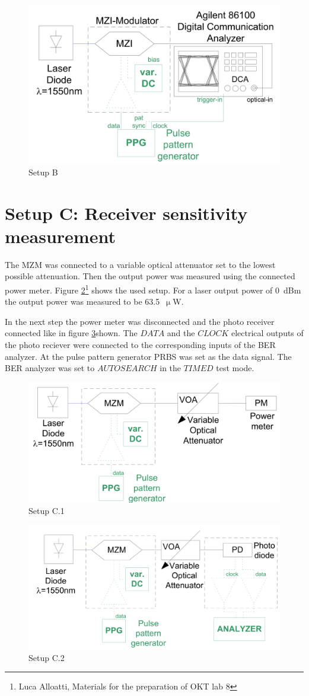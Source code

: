 \begin{figure}%
\centering
\includegraphics[width=.6\columnwidth]{Grafiken/B_setup.png}%
\caption{Setup B}%
\label{fig:B_setup}%
\end{figure} 


\section{Setup C: Receiver sensitivity measurement}

The MZM was connected to a variable optical attenuator set to the lowest possible attenuation. Then the output power was measured using the connected power meter. Figure \ref{fig:C_setup1}\footnote[3]{Luca Alloatti, Materials for the preparation of OKT lab 8} shows the used setup. For a laser output power of 0~dBm the output power was measured to be 63.5~$\upmu$W.

In the next step the power meter was disconnected and the photo receiver connected like in figure \ref{fig:C_setup2}\footnotemark[3] shown. The $DATA$ and the $CLOCK$ electrical outputs of the photo reciever were connected to the corresponding inputs of the BER analyzer. At the pulse pattern generator PRBS was set as the data signal. The BER analyzer was set to $AUTOSEARCH$ in the $TIMED$ test mode. 
\begin{figure}%
\centering
\includegraphics[width=.6\columnwidth]{Grafiken/C_setup1.png}%
\caption{Setup C.1}%
\label{fig:C_setup1}%
\end{figure}


\begin{figure}%
\centering
\includegraphics[width=.6\columnwidth]{Grafiken/C_setup2.png}%
\caption{Setup C.2}%
\label{fig:C_setup2}%
\end{figure}



